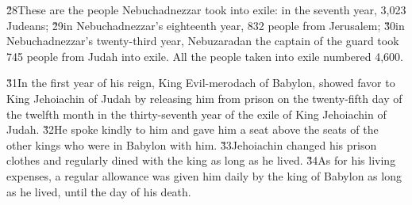\v{28}These are the people Nebuchadnezzar took into exile: in the seventh year, 3,023 Judeans; \v{29}in Nebuchadnezzar's eighteenth year, 832 people from Jerusalem; \v{30}in Nebuchadnezzar's twenty-third year, Nebuzaradan the captain of the guard took 745 people from Judah into exile. All the people taken into exile numbered 4,600.

\v{31}In the first year of his reign, King Evil-merodach of Babylon, showed favor to King Jehoiachin of Judah by releasing him from prison on the twenty-fifth day of the twelfth month in the thirty-seventh year of the exile of King Jehoiachin of Judah. \v{32}He spoke kindly to him and gave him a seat above the seats of the other kings who were in Babylon with him. \v{33}Jehoiachin changed his prison clothes and regularly dined with the king as long as he lived. \v{34}As for his living expenses, a regular allowance was given him daily by the king of Babylon as long as he lived, until the day of his death.
